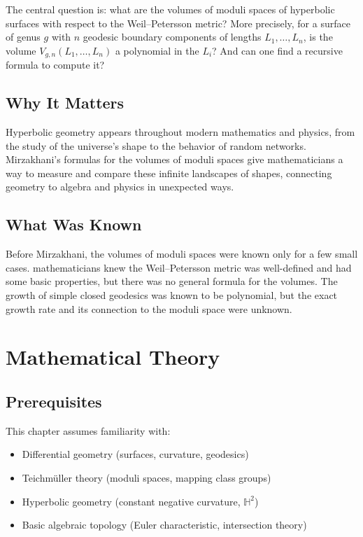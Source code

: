 The central question is: what are the volumes of moduli spaces of hyperbolic surfaces with respect to the Weil--Petersson metric? More precisely, for a surface of genus $g$ with $n$ geodesic boundary components of lengths $L_1, \ldots, L_n$, is the volume $V_{g,n}(L_1, \ldots, L_n)$ a polynomial in the $L_i$? And can one find a recursive formula to compute it?

\subsection{Why It Matters}
Hyperbolic geometry appears throughout modern mathematics and physics, from the study of the universe's shape to the behavior of random networks. Mirzakhani's formulas for the volumes of moduli spaces give mathematicians a way to measure and compare these infinite landscapes of shapes, connecting geometry to algebra and physics in unexpected ways.

\subsection{What Was Known}
Before Mirzakhani, the volumes of moduli spaces were known only for a few small cases. mathematicians knew the Weil--Petersson metric was well-defined and had some basic properties, but there was no general formula for the volumes. The growth of simple closed geodesics was known to be polynomial, but the exact growth rate and its connection to the moduli space were unknown.

\section{Mathematical Theory}


\subsection{Prerequisites}
This chapter assumes familiarity with:
\begin{itemize}
\item Differential geometry (surfaces, curvature, geodesics)
\item Teichm\"uller theory (moduli spaces, mapping class groups)
\item Hyperbolic geometry (constant negative curvature, $\mathbb{H}^2$)
\item Basic algebraic topology (Euler characteristic, intersection theory)
\end{itemize}


